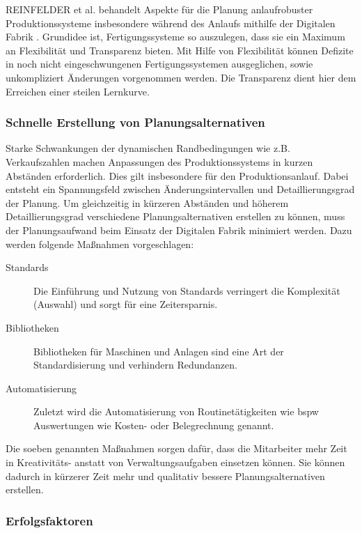 REINFELDER et al. behandelt Aspekte für die Planung anlaufrobuster Produktionssysteme insbesondere während des Anlaufs mithilfe der Digitalen Fabrik %
\autocite{Reinfelder2004}. 
Grundidee ist, Fertigungssysteme so auszulegen, dass sie ein Maximum an Flexibilität und Transparenz bieten. Mit Hilfe von Flexibilität können Defizite in noch nicht eingeschwungenen Fertigungssystemen ausgeglichen, sowie unkompliziert Änderungen vorgenommen werden. Die Transparenz dient hier dem Erreichen einer steilen Lernkurve. 

\subsubsection{Schnelle Erstellung von Planungsalternativen}

Starke Schwankungen der dynamischen Randbedingungen wie z.B. Verkaufszahlen machen Anpassungen des Produktionssystems in kurzen Abständen erforderlich. Dies gilt insbesondere für den Produktionsanlauf. Dabei entsteht ein Spannungsfeld zwischen Änderungsintervallen und Detaillierungsgrad der Planung. Um gleichzeitig in kürzeren Abständen und höherem Detaillierungsgrad verschiedene Planungsalternativen erstellen zu können, muss der Planungsaufwand beim Einsatz der Digitalen Fabrik minimiert werden. 
Dazu werden folgende Maßnahmen vorgeschlagen: 
\begin{description}
\item[Standards] Die Einführung und Nutzung von Standards verringert die Komplexität (Auswahl) und sorgt für eine Zeitersparnis.
 \item[Bibliotheken] Bibliotheken für Maschinen und Anlagen sind eine Art der Standardisierung und verhindern Redundanzen.
 \item[Automatisierung] Zuletzt wird die Automatisierung von Routinetätigkeiten wie \gls{bspw} Auswertungen wie Kosten- oder Belegrechnung genannt. 
\end{description}


%
% 
Die soeben genannten Maßnahmen sorgen dafür, dass die Mitarbeiter mehr Zeit in Kreativitäts- anstatt von Verwaltungsaufgaben einsetzen können. Sie können dadurch in kürzerer Zeit mehr und qualitativ bessere Planungsalternativen erstellen. 

\subsubsection{Erfolgsfaktoren}

